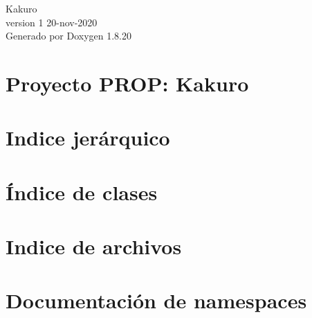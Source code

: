 \let\mypdfximage\pdfximage\def\pdfximage{\immediate\mypdfximage}\documentclass[twoside]{book}
\newcommand{\+}{\discretionary{\mbox{\scriptsize$\hookleftarrow$}}{}{}}
\newcommand{\clearemptydoublepage}{%
  \newpage{\pagestyle{empty}\cleardoublepage}%
}
\begin{document}
\hypersetup{pageanchor=false,
             bookmarksnumbered=true,
             pdfencoding=unicode
            }
\begin{titlepage}
\vspace*{7cm}
\begin{center}%
{\Large Kakuro \\[1ex]\large version 1 20-\/nov-\/2020 }\\
\vspace*{1cm}
{\large Generado por Doxygen 1.8.20}\\
\end{center}
\end{titlepage}
\clearemptydoublepage
{}
\tableofcontents
\clearemptydoublepage
{}
\hypersetup{pageanchor=true}

\chapter{Proyecto P\+R\+OP\+: Kakuro}
\label{index}\hypertarget{index}{}
\chapter{Indice jerárquico}

\chapter{Índice de clases}

\chapter{Indice de archivos}

\chapter{Documentación de namespaces}







\end{document}
